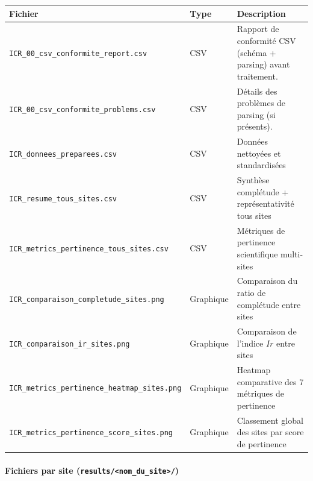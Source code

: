 {\def\LTcaptype{none} %
\begin{longtable}[]{@{}
  >{\raggedright\arraybackslash}p{}
  >{\raggedright\arraybackslash}p{}
  >{\raggedright\arraybackslash}p{}@{}}
\toprule\noalign{}
\begin{minipage}[b]{\linewidth}\raggedright
Fichier
\end{minipage} & \begin{minipage}[b]{\linewidth}\raggedright
Type
\end{minipage} & \begin{minipage}[b]{\linewidth}\raggedright
Description
\end{minipage} \\
\midrule\noalign{}
\endhead
\bottomrule\noalign{}
\endlastfoot
\texttt{ICR\_00\_csv\_conformite\_report.csv} & CSV & Rapport de
conformité CSV (schéma + parsing) avant traitement. \\
\texttt{ICR\_00\_csv\_conformite\_problems.csv} & CSV & Détails des
problèmes de parsing (si présents). \\
\texttt{ICR\_donnees\_preparees.csv} & CSV & Données nettoyées et
standardisées \\
\texttt{ICR\_resume\_tous\_sites.csv} & CSV & Synthèse complétude +
représentativité tous sites \\
\texttt{ICR\_metrics\_pertinence\_tous\_sites.csv} & CSV & Métriques de
pertinence scientifique multi-sites \\
\texttt{ICR\_comparaison\_completude\_sites.png} & Graphique &
Comparaison du ratio de complétude entre sites \\
\texttt{ICR\_comparaison\_ir\_sites.png} & Graphique & Comparaison de
l'indice \(Ir\) entre sites \\
\texttt{ICR\_metrics\_pertinence\_heatmap\_sites.png} & Graphique &
Heatmap comparative des 7 métriques de pertinence \\
\texttt{ICR\_metrics\_pertinence\_score\_sites.png} & Graphique &
Classement global des sites par score de pertinence \\
\end{longtable}
}

\paragraph{\texorpdfstring{Fichiers par site
(\texttt{results/\textless{}nom\_du\_site\textgreater{}/})}{Fichiers par site (results/\textless nom\_du\_site\textgreater/)}}\label{fichiers-par-site-resultsnom_du_site}

